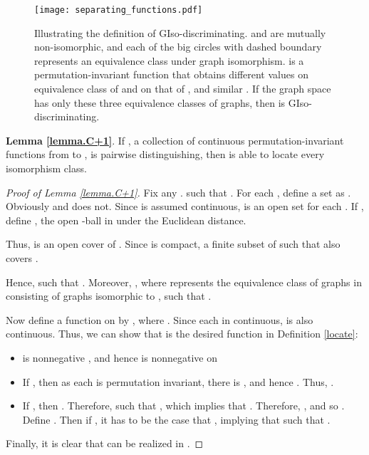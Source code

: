\documentclass{article}
\begin{document}
\begin{figure}
\label{giso}
    \centering
    \texttt{[image: separating\_functions.pdf]}
\caption{Illustrating the definition of GIso-discriminating.  and  are mutually non-isomorphic, and each of the big circles with dashed boundary represents an equivalence class under graph isomorphism.  is a permutation-invariant function that obtains different values on equivalence class of  and on that of , and similar . If the graph space has only these three equivalence classes of graphs, then  is GIso-discriminating.}
\end{figure}

\textbf{Lemma \ref{lemma.C+1}}.
If , a collection of continuous permutation-invariant functions from  to , is pairwise distinguishing, then  is able to locate every isomorphism class.

\begin{proof}[Proof of Lemma \ref{lemma.C+1}]
Fix any .  such that . For each , define a set  as . Obviously  and  does not. Since  is assumed continuous,  is an open set for each . If , define , the open -ball in  under the Euclidean distance.

Thus,  is an open cover of . Since  is compact,  a finite subset  of  such that  also covers . 

Hence,  such that . Moreover, , where  represents the equivalence class of graphs in  consisting of graphs isomorphic to ,  such that .

Now define a function  on  by , where . Since each  in continuous,  is also continuous. Thus, we can show that  is the desired function in Definition \ref{locate}:

\begin{itemize}
    \item  is nonnegative , and hence  is nonnegative on 
    
    \item If , then as each  is permutation invariant, there is , and hence . Thus, .
    
    \item If , then . Therefore,  such that , which implies that . Therefore, , and so . Define . Then if , it has to be the case that , implying that  such that .
\end{itemize}

Finally, it is clear that  can be realized in .

\end{proof}
\end{document}
